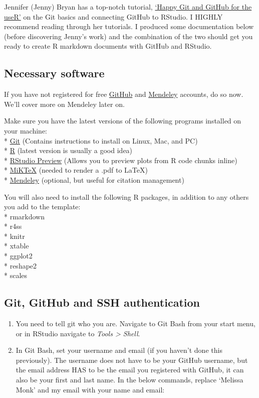 \documentclass[12pt,]{article}
\begin{document}
Jennifer (Jenny) Bryan has a top-notch tutorial,
\href{http://happygitwithr.com/}{`Happy Git and GitHub for the useR'} on
the Git basics and connecting GitHub to RStudio. I HIGHLY recommend
reading through her tutorials. I produced some documentation below
(before discovering Jenny's work) and the combination of the two should
get you ready to create R markdown documents with GitHub and RStudio.

\subsection{Necessary software}\label{necessary-software}

If you have not registered for free \href{https://github.com}{GitHub}
and \href{www.mendeley.com}{Mendeley} accounts, do so now. We'll cover
more on Mendeley later on.

Make sure you have the latest versions of the following programs
installed on your machine:\\
*
\href{https://git-scm.com/book/en/v2/Getting-Started-Installing-Git}{Git}
(Contains instructions to install on Linux, Mac, and PC)\\
* \href{https://cran.r-project.org/bin/windows/base/}{R} (latest version
is usually a good idea)\\
*
\href{https://www.rstudio.com/products/rstudio/download/preview/}{RStudio
Preview} (Allows you to preview plots from R code chunks inline)\\
* \href{http://miktex.org/}{MiKTeX} (needed to render a .pdf to
\LaTeX)\\
* \href{https://www.mendeley.com/}{Mendeley} (optional, but useful for
citation management)

You will also need to install the following R packages, in addition to
any others you add to the template:\\
* rmarkdown\\
* r4ss\\
* knitr\\
* xtable\\
* ggplot2\\
* reshape2\\
* scales

\subsection{Git, GitHub and SSH
authentication}\label{git-github-and-ssh-authentication}

\begin{enumerate}
\def\labelenumi{\arabic{enumi}.}
\item
  You need to tell git who you are. Navigate to Git Bash from your start
  menu, or in RStudio navigate to \emph{Tools \textgreater{} Shell}.
\item
  In Git Bash, set your username and email (if you haven't done this
  previously). The username does not have to be your GitHub username,
  but the email address HAS to be the email you registered with GitHub,
  it can also be your first and last name. In the below commands,
  replace `Melissa Monk' and my email with your name and email:
\end{enumerate}
\end{document}
